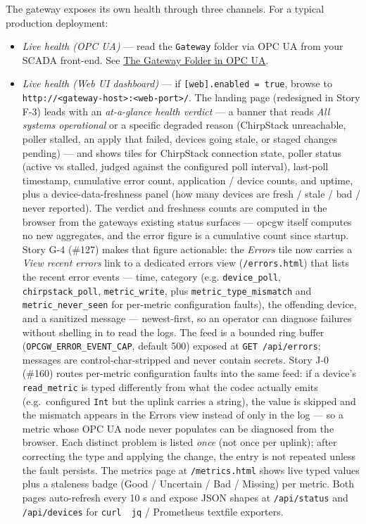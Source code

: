 The gateway exposes its own health through three channels. For a typical production deployment:

\begin{itemize}
\item
  \emph{Live health (OPC UA)} --- read the \texttt{Gateway} folder via OPC UA from your SCADA front-end. See \hyperref[sec-gateway-folder]{The Gateway Folder in OPC UA}.
\item
  \emph{Live health (Web UI dashboard)} --- if \texttt{{[}web{]}.enabled\ =\ true}, browse to \texttt{http://\textless{}gateway-host\textgreater{}:\textless{}web-port\textgreater{}/}. The landing page (redesigned in Story F-3) leads with an \emph{at-a-glance health verdict} --- a banner that reads \emph{All systems operational} or a specific degraded reason (ChirpStack unreachable, poller stalled, an apply that failed, devices going stale, or staged changes pending) --- and shows tiles for ChirpStack connection state, poller status (active vs stalled, judged against the configured poll interval), last-poll timestamp, cumulative error count, application / device counts, and uptime, plus a device-data-freshness panel (how many devices are fresh / stale / bad / never reported). The verdict and freshness counts are computed in the browser from the gateway\textquotesingle s existing status surfaces --- opcgw itself computes no new aggregates, and the error figure is a cumulative count since startup. Story G-4 (\#127) makes that figure actionable: the \emph{Errors} tile now carries a \emph{View recent errors} link to a dedicated errors view (\texttt{/errors.html}) that lists the recent error events --- time, category (e.g. \texttt{device\_poll}, \texttt{chirpstack\_poll}, \texttt{metric\_write}, plus \texttt{metric\_type\_mismatch} and \texttt{metric\_never\_seen} for per-metric configuration faults), the offending device, and a sanitized message --- newest-first, so an operator can diagnose failures without shelling in to read the logs. The feed is a bounded ring buffer (\texttt{OPCGW\_ERROR\_EVENT\_CAP}, default 500) exposed at \texttt{GET\ /api/errors}; messages are control-char-stripped and never contain secrets. Story J-0 (\#160) routes per-metric configuration faults into the same feed: if a device's \texttt{read\_metric} is typed differently from what the codec actually emits (e.g.\ configured \texttt{Int} but the uplink carries a string), the value is skipped and the mismatch appears in the Errors view instead of only in the log --- so a metric whose OPC UA node never populates can be diagnosed from the browser. Each distinct problem is listed \emph{once} (not once per uplink); after correcting the type and applying the change, the entry is not repeated unless the fault persists. The metrics page at \texttt{/metrics.html} shows live typed values plus a staleness badge (Good / Uncertain / Bad / Missing) per metric. Both pages auto-refresh every 10 s and expose JSON shapes at \texttt{/api/status} and \texttt{/api/devices} for \texttt{curl\ \textbar{}\ jq} / Prometheus textfile exporters.

\end{itemize}

